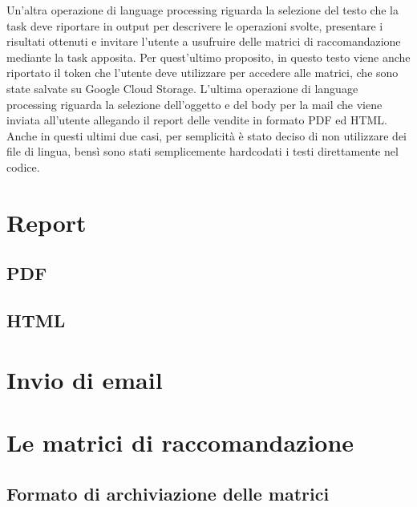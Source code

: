 Un'altra operazione di language processing riguarda la selezione del testo che la task deve riportare in output per descrivere le operazioni svolte, presentare i risultati ottenuti e invitare l'utente a usufruire delle matrici di raccomandazione mediante la task apposita. Per quest'ultimo proposito, in questo testo viene anche riportato il token che l'utente deve utilizzare per accedere alle matrici, che sono state salvate su Google Cloud Storage.
L'ultima operazione di language processing riguarda la selezione dell'oggetto e del body per la mail che viene inviata all'utente allegando il report delle vendite in formato PDF ed HTML.
Anche in questi ultimi due casi, per semplicità è stato deciso di non utilizzare dei file di lingua, bensì sono stati semplicemente hardcodati i testi direttamente nel codice.


\section{Report}
\subsection{PDF}
\subsection{HTML}

\section{Invio di email}

\section{Le matrici di raccomandazione}

\subsection{Formato di archiviazione delle matrici}

